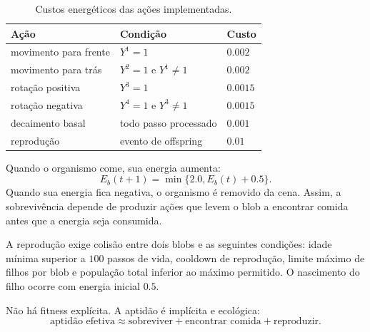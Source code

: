 \documentclass[12pt,a4paper,fleqn]{article}
\begin{document}
\begin{table}[H]
\centering
\caption{Custos energéticos das ações implementadas.}
\label{tab:energia}
\begin{tabular}{lll}
\toprule
Ação & Condição & Custo \\
\midrule
movimento para frente & $Y^1=1$ & $0.002$ \\
movimento para trás & $Y^2=1$ e $Y^1\neq1$ & $0.002$ \\
rotação positiva & $Y^3=1$ & $0.0015$ \\
rotação negativa & $Y^4=1$ e $Y^3\neq1$ & $0.0015$ \\
decaimento basal & todo passo processado & $0.001$ \\
reprodução & evento de offspring & $0.01$ \\
\bottomrule
\end{tabular}
\end{table}

Quando o organismo come, sua energia aumenta:
$$
	E_b(t+1)=\min\{2.0,E_b(t)+0.5\}.
$$
Quando sua energia fica negativa, o organismo é removido da cena. Assim, a sobrevivência depende de produzir ações que levem o blob a encontrar comida antes que a energia seja consumida.

A reprodução exige colisão entre dois blobs e as seguintes condições: idade mínima superior a $100$ passos de vida, cooldown de reprodução, limite máximo de filhos por blob e população total inferior ao máximo permitido. O nascimento do filho ocorre com energia inicial $0.5$.

Não há fitness explícita. A aptidão é implícita e ecológica:
$$
	\text{aptidão efetiva} \approx \text{sobreviver} + \text{encontrar comida} + \text{reproduzir}.
$$
\end{document}
